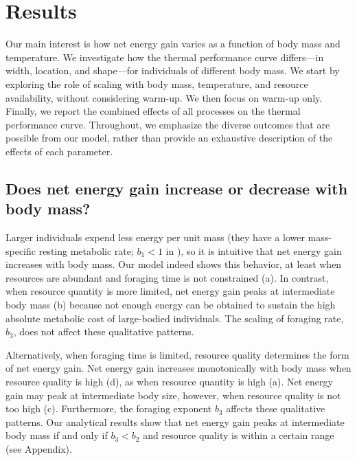 \section*{Results}

Our main interest is how net energy gain varies as a function of body mass and temperature.
We investigate how the thermal performance curve differs---in width, location, and shape---for individuals of different body mass.
We start by exploring the role of scaling with body mass, temperature, and resource availability, without considering warm-up.
We then focus on warm-up only.
Finally, we report the combined effects of all processes on the thermal performance curve.
Throughout, we emphasize the diverse outcomes that are possible from our model, rather than provide an exhaustive description of the effects of each parameter.


\subsection*{Does net energy gain increase or decrease with body mass?}

Larger individuals expend less energy per unit mass (they have a lower mass-specific resting metabolic rate; $b_1 < 1$ in ), so it is intuitive that net energy gain increases with body mass.
Our model indeed shows this behavior, at least when resources are abundant and foraging time is not constrained (a).
In contrast, when resource quantity is more limited, net energy gain peaks at intermediate body mass (b) because not enough energy can be obtained to sustain the high absolute metabolic cost of large-bodied individuals.
The scaling of foraging rate, $b_3$, does not affect these qualitative patterns.

Alternatively, when foraging time is limited, resource quality determines the form of net energy gain.
Net energy gain increases monotonically with body mass when resource quality is high (d), as when resource quantity is high (a).
Net energy gain may peak at intermediate body size, however, when resource quality is not too high (c).
Furthermore, the foraging exponent $b_3$ affects these qualitative patterns.
Our analytical results show that net energy gain peaks at intermediate body mass if and only if $b_3 < b_2$ and resource quality is within a certain range (see Appendix).

